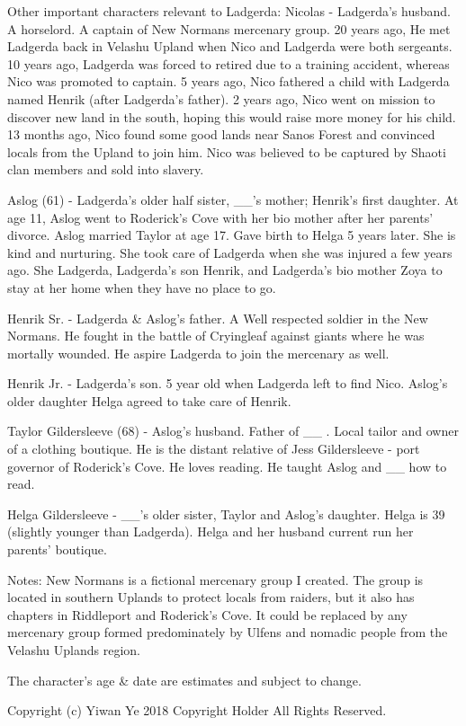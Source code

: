 Other important characters relevant to Ladgerda:
  Nicolas - Ladgerda's husband. A horselord. A captain of New Normans mercenary group.
    20 years ago, He met Ladgerda back in Velashu Upland when Nico and Ladgerda were both sergeants.
    10 years ago, Ladgerda was forced to retired due to a training accident, whereas Nico was promoted to captain.
    5 years ago, Nico fathered a child with Ladgerda named Henrik (after Ladgerda's father).
    2 years ago, Nico went on mission to discover new land in the south, hoping this would raise more money for his child.
    13 months ago, Nico found some good lands near Sanos Forest and convinced locals from the Upland to join him.
    Nico was believed to be captured by Shaoti clan members and sold into slavery.

  Aslog (61) - Ladgerda’s older half sister, __'s mother; Henrik’s first daughter.
    At age 11, Aslog went to Roderick's Cove with her bio mother after her parents' divorce.
    Aslog married Taylor at age 17. Gave birth to Helga 5 years later.
    She is kind and nurturing. She took care of Ladgerda when she was injured a few years ago.
    She Ladgerda, Ladgerda's son Henrik, and Ladgerda's bio mother Zoya to stay at her home when they have no place to go.

  Henrik Sr. - Ladgerda & Aslog's father. A Well respected soldier in the New Normans.
    He fought in the battle of Cryingleaf against giants where he was mortally wounded.
    He aspire Ladgerda to join the mercenary as well.

  Henrik Jr. - Ladgerda's son. 5 year old when Ladgerda left to find Nico.
    Aslog's older daughter Helga agreed to take care of Henrik.

  Taylor Gildersleeve (68) - Aslog's husband. Father of __ . Local tailor and owner of a clothing boutique.
    He is the distant relative of Jess Gildersleeve - port governor of Roderick's Cove.
    He loves reading. He taught Aslog and __ how to read.

  Helga Gildersleeve - __'s older sister, Taylor and Aslog's daughter.
    Helga is 39 (slightly younger than Ladgerda).
    Helga and her husband current run her parents' boutique.

Notes:
  New Normans is a fictional mercenary group I created.
    The group is located in southern Uplands to protect locals from raiders, but it also has chapters in Riddleport and Roderick's Cove.
    It could be replaced by any mercenary group formed predominately by Ulfens and nomadic people from the Velashu Uplands region.

  The character's age & date are estimates and subject to change.

Copyright (c) Yiwan Ye 2018 Copyright Holder All Rights Reserved.
